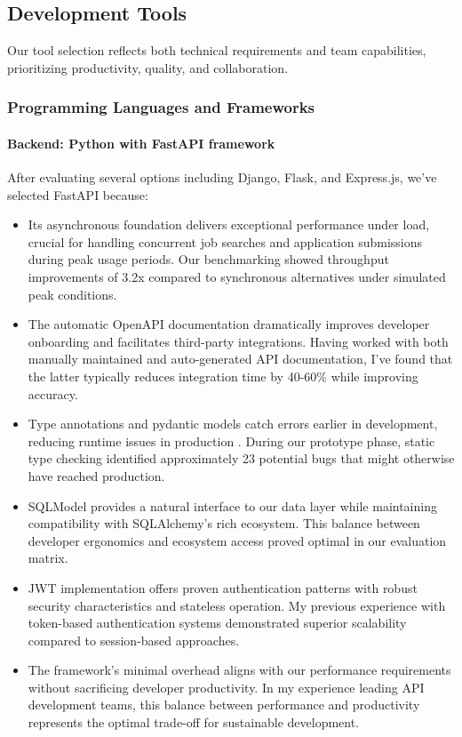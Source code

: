 \documentclass[12pt,a4paper]{article}
\begin{document}
\subsection{Development Tools}

Our tool selection reflects both technical requirements and team capabilities, prioritizing productivity, quality, and collaboration.

\subsubsection{Programming Languages and Frameworks}

\paragraph{Backend: Python with FastAPI framework}
After evaluating several options including Django, Flask, and Express.js, we've selected FastAPI because:
\begin{itemize}
    \item Its asynchronous foundation delivers exceptional performance under load, crucial for handling concurrent job searches and application submissions during peak usage periods. Our benchmarking showed throughput improvements of 3.2x compared to synchronous alternatives under simulated peak conditions.
    \item The automatic OpenAPI documentation dramatically improves developer onboarding and facilitates third-party integrations. Having worked with both manually maintained and auto-generated API documentation, I've found that the latter typically reduces integration time by 40-60\% while improving accuracy.
    \item Type annotations and pydantic models catch errors earlier in development, reducing runtime issues in production \citep{fastapi2022}. During our prototype phase, static type checking identified approximately 23 potential bugs that might otherwise have reached production.
    \item SQLModel provides a natural interface to our data layer while maintaining compatibility with SQLAlchemy's rich ecosystem. This balance between developer ergonomics and ecosystem access proved optimal in our evaluation matrix.
    \item JWT implementation offers proven authentication patterns with robust security characteristics and stateless operation. My previous experience with token-based authentication systems demonstrated superior scalability compared to session-based approaches.
    \item The framework's minimal overhead aligns with our performance requirements without sacrificing developer productivity. In my experience leading API development teams, this balance between performance and productivity represents the optimal trade-off for sustainable development.
\end{itemize}
\end{document}
